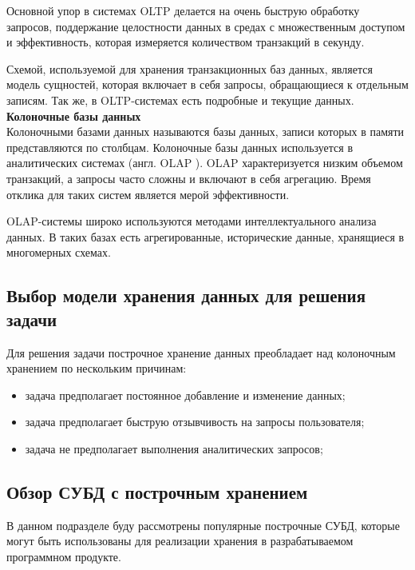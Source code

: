 Основной упор в системах OLTP делается на очень быструю обработку запросов, поддержание целостности данных в средах с множественным доступом и эффективность, которая измеряется количеством транзакций в секунду. 

Схемой, используемой для хранения транзакционных баз данных, является модель сущностей, которая включает в себя запросы, обращающиеся к отдельным записям. Так же, в OLTP-системах есть подробные и текущие данных.\\

\noindent\textbf{Колоночные базы данных}\\

Колоночными базами данных называются базы данных, записи которых в памяти представляются по столбцам. Колоночные базы данных используется в аналитических системах (англ. OLAP \cite{olap}). OLAP характеризуется низким объемом транзакций, а запросы часто сложны и включают в себя агрегацию. Время отклика для таких систем является мерой эффективности.

OLAP-системы широко используются методами интеллектуального анализа данных. В таких базах есть агрегированные, исторические данные, хранящиеся в многомерных схемах. 

\subsection{Выбор модели хранения данных для решения задачи}

Для решения задачи построчное хранение данных преобладает над колоночным хранением по нескольким причинам:

\begin{itemize}
	\item задача предполагает постоянное добавление и изменение данных;
	\item задача предполагает быструю отзывчивость на запросы пользователя;
	\item задача не предполагает выполнения аналитических запросов;
\end{itemize}

\subsection{Обзор СУБД с построчным хранением}

В данном подразделе буду рассмотрены популярные построчные СУБД, которые могут быть использованы для реализации хранения в разрабатываемом программном продукте.\\

